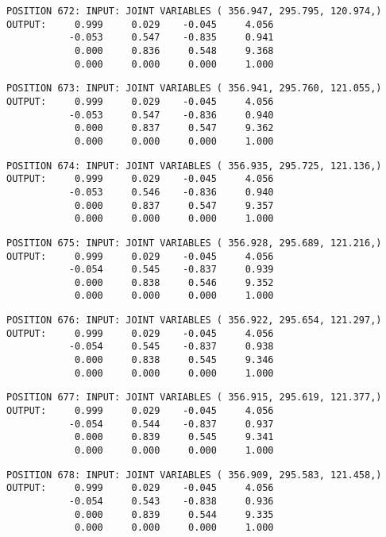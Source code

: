 \begin{verbatim}
POSITION 672: INPUT: JOINT VARIABLES ( 356.947, 295.795, 120.974,)
OUTPUT:     0.999     0.029    -0.045     4.056
           -0.053     0.547    -0.835     0.941
            0.000     0.836     0.548     9.368
            0.000     0.000     0.000     1.000
\end{verbatim} \pagebreak[1]\begin{verbatim}
POSITION 673: INPUT: JOINT VARIABLES ( 356.941, 295.760, 121.055,)
OUTPUT:     0.999     0.029    -0.045     4.056
           -0.053     0.547    -0.836     0.940
            0.000     0.837     0.547     9.362
            0.000     0.000     0.000     1.000
\end{verbatim} \pagebreak[1]\begin{verbatim}
POSITION 674: INPUT: JOINT VARIABLES ( 356.935, 295.725, 121.136,)
OUTPUT:     0.999     0.029    -0.045     4.056
           -0.053     0.546    -0.836     0.940
            0.000     0.837     0.547     9.357
            0.000     0.000     0.000     1.000
\end{verbatim} \pagebreak[1]\begin{verbatim}
POSITION 675: INPUT: JOINT VARIABLES ( 356.928, 295.689, 121.216,)
OUTPUT:     0.999     0.029    -0.045     4.056
           -0.054     0.545    -0.837     0.939
            0.000     0.838     0.546     9.352
            0.000     0.000     0.000     1.000
\end{verbatim} \pagebreak[1]\begin{verbatim}
POSITION 676: INPUT: JOINT VARIABLES ( 356.922, 295.654, 121.297,)
OUTPUT:     0.999     0.029    -0.045     4.056
           -0.054     0.545    -0.837     0.938
            0.000     0.838     0.545     9.346
            0.000     0.000     0.000     1.000
\end{verbatim} \pagebreak[1]\begin{verbatim}
POSITION 677: INPUT: JOINT VARIABLES ( 356.915, 295.619, 121.377,)
OUTPUT:     0.999     0.029    -0.045     4.056
           -0.054     0.544    -0.837     0.937
            0.000     0.839     0.545     9.341
            0.000     0.000     0.000     1.000
\end{verbatim} \pagebreak[1]\begin{verbatim}
POSITION 678: INPUT: JOINT VARIABLES ( 356.909, 295.583, 121.458,)
OUTPUT:     0.999     0.029    -0.045     4.056
           -0.054     0.543    -0.838     0.936
            0.000     0.839     0.544     9.335
            0.000     0.000     0.000     1.000
\end{verbatim} \pagebreak[1]\begin{verbatim}

\end{verbatim}
